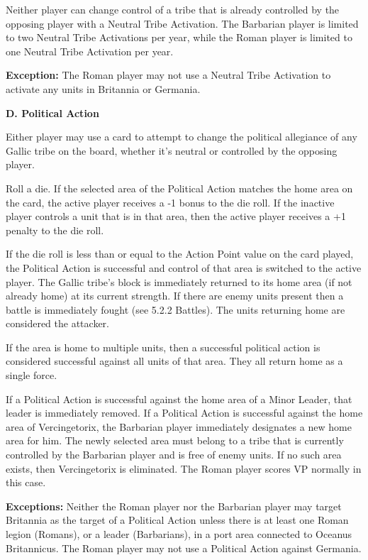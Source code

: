 Neither player can change control of a tribe that is already controlled by the opposing player with a Neutral Tribe Activation. The Barbarian player is limited to two Neutral Tribe Activations per year, while the Roman player is limited to one Neutral Tribe Activation per year.

\textbf{Exception:} The Roman player may not use a Neutral Tribe Activation to activate any units in Britannia or Germania.

\textbf{D. Political Action}
\par
Either player may use a card to attempt to change the political allegiance of any Gallic tribe on the board, whether it's neutral or controlled by the opposing player.

Roll a die. If the selected area of the Political Action matches the home area on the card, the active player receives a -1 bonus to the die roll. If the inactive player controls a unit that is in that area, then the active player receives a +1 penalty to the die roll.

If the die roll is less than or equal to the Action Point value on the card played, the Political Action is successful and control of that area is switched to the active player. The Gallic tribe's block is immediately returned to its home area (if not already home) at its current strength. If there are enemy units present then a battle is immediately fought (see 5.2.2 Battles). The units returning home are considered the attacker.

If the area is home to multiple units, then a successful political action is considered successful against all units of that area. They all return home as a single force.

If a Political Action is successful against the home area of a Minor Leader, that leader is immediately removed. If a Political Action is successful  against the home area of Vercingetorix, the Barbarian player immediately designates a new home area for him. The newly selected area must belong to a tribe that is currently controlled by the Barbarian player and is free of enemy units. If no such area exists, then Vercingetorix is eliminated. The Roman player scores VP normally in this case.

\textbf{Exceptions:} Neither the Roman player nor the Barbarian player may target Britannia as the target of a Political Action unless there is at least one Roman legion (Romans), or a leader (Barbarians), in a port area connected to Oceanus Britannicus. The Roman player may not use a Political Action against Germania.


